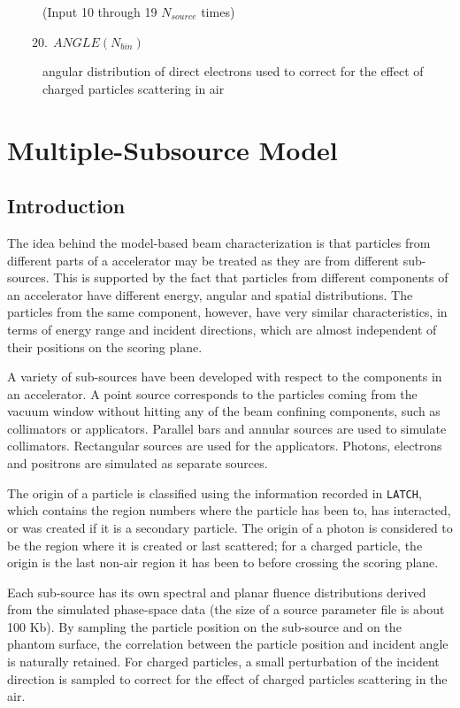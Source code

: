 \documentclass[12pt,twoside]{article}
\begin{document}
\begin{description}
(Input 10 through 19 $N_{source}$ times)

\item [~~~~$20. ~~ANGLE(N_{bin})$] angular distribution of direct electrons used to correct for the effect of charged particles scattering in air

\end{description}

\section{Multiple-Subsource Model}
\subsection{Introduction}

The idea behind the model-based beam characterization is that particles from different parts of a accelerator may be treated as they are from different sub-sources. This is supported by the fact that particles from different components of an accelerator have different energy, angular and spatial distributions. The particles from the same component, however, have very similar characteristics, in terms of energy range and incident directions, which are almost independent of their positions on the scoring plane\cite{Ma95c}.

A variety of sub-sources have been developed with respect to the components in an accelerator. A point source corresponds to the particles coming from the vacuum window without hitting any of the beam confining components, such as collimators or applicators. Parallel bars and annular sources are used to simulate collimators. Rectangular sources are used for the applicators. Photons, electrons and positrons are simulated as separate sources.

The origin of a particle is classified using the information recorded in {\tt LATCH},
which contains the region numbers where the particle has been to, has
interacted, or was created if it is a secondary particle. The origin of a
photon is considered to be the region where it is created or last
scattered; for a charged particle, the origin is the last non-air region
it has been to before crossing the scoring plane.

Each sub-source has its own spectral and planar fluence distributions derived from the simulated phase-space data (the size of a source parameter file is about 100 Kb). By sampling the particle position on the sub-source and on the phantom surface, the correlation between the particle position and incident angle is naturally retained. For charged particles, a small perturbation of the incident direction is sampled to correct for the effect of charged particles scattering in the air.
\end{document}
